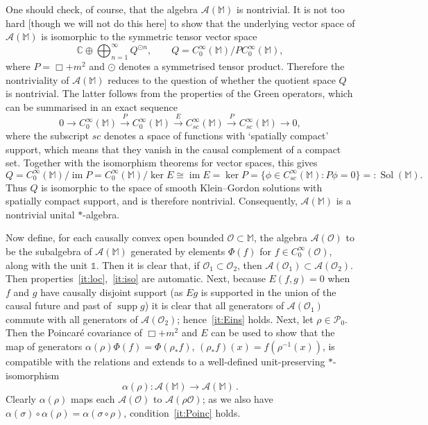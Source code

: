 \documentclass[12pt,a4paper]{article}
\newcommand{\1}{\mathds{1}}                         %
\newcommand{\CC}{\mathbb{C}}           %
\newcommand{\Ocal}{\mathcal{O}}
\newcommand{\MM}{\mathbb{M}}
\newcommand{\II}{{\mathbb{1}}}
\newcommand{\Ac}{{\mathcal{A}}}
\newcommand{\Pc}{{\mathcal{P}}}
\newcommand{\CoinX}[1]{C_0^\infty(#1)}
\DeclareMathOperator{\im}{im}
\DeclareMathOperator{\supp}{supp}
\DeclareMathOperator{\Sol}{Sol}
\begin{document}
	One should check, of course, that the algebra $\Ac(\MM)$ is nontrivial. It is not too hard [though we will not do this here] to show that the underlying vector space of $\Ac(\MM)$ is isomorphic to the symmetric tensor vector space
	\[
	\CC \oplus \bigoplus_{n=1}^\infty Q^{\odot n}, \qquad Q = \CoinX{\MM}/P \CoinX{\MM},
	\]
	where $P=\Box+m^2$ and $\odot$ denotes a symmetrised tensor product.  
	Therefore the nontriviality of $\Ac(\MM)$ reduces to the question of whether the quotient space $Q$ is nontrivial. 
	The latter follows from the properties of the Green operators, which can be summarised in an exact sequence~\cite{BarGinouxPfaffle}
	\begin{equation}\label{eq:exactsequence}
	0 \longrightarrow \CoinX{\MM}\stackrel{P}{\longrightarrow}  \CoinX{\MM} \stackrel{E}{\longrightarrow}
	C^\infty_{\textit{sc}} (\MM) \stackrel{P}{\longrightarrow}C^\infty_{\textit{sc}} (\MM) \longrightarrow 0,
	\end{equation} 
	where the subscript $sc$ denotes a space of functions with `spatially compact' support, which means that they vanish in the causal complement of a compact set. Together with the isomorphism theorems for vector spaces, this gives
	\begin{equation}
	Q =\CoinX{\MM}/\im P = \CoinX{\MM}/\ker E \cong \im E = \ker P =\{\phi\in C^\infty_{\textit{sc}} (\MM): P\phi=0\}=:\Sol(\MM).
	\end{equation}
	Thus $Q$ is isomorphic to the space of smooth Klein--Gordon solutions with spatially compact support, and is therefore nontrivial. Consequently, $\Ac(\MM)$ is a nontrivial unital $*$-algebra.
	
	Now define, for each causally convex open bounded $\Ocal\subset\MM$, the algebra $\Ac(\Ocal)$ to be the subalgebra of $\Ac(\MM)$ generated by elements $\Phi(f)$ for $f\in\CoinX{\Ocal}$, along with the unit $\II$. 
	Then it is clear that, if $\Ocal_1\subset \Ocal_2$, then $\Ac(\Ocal_1)\subset \Ac(\Ocal_2)$. Then properties~\ref{it:loc},~\ref{it:iso} are automatic.
	Next, because $E(f,g)=0$ when $f$ and $g$ have causally disjoint support (as $Eg$ is supported in the union of the causal future and past of $\supp g$) it is clear that all generators of $\Ac(\Ocal_1)$ commute with all generators of $\Ac(\Ocal_2)$; hence~\ref{it:Eins} holds. Next, let $\rho\in\Pc_0$. Then the Poincar\'e covariance of $\Box+m^2$ and $E$ can be used to show that
	the map of generators $\alpha(\rho)\Phi(f) = \Phi(\rho_* f)$, $(\rho_*f)(x)=f(\rho^{-1}(x))$, is compatible with the relations and extends to a well-defined unit-preserving $*$-isomorphism
	\begin{equation}
	\alpha(\rho):\Ac(\MM)\to\Ac(\MM)\,.
	\end{equation}
	Clearly $\alpha(\rho)$ maps each $\Ac(\Ocal)$ to $\Ac(\rho\Ocal)$; as we also have $\alpha(\sigma)\circ\alpha(\rho)=\alpha(\sigma\circ\rho)$,  condition~\ref{it:Poinc} holds. 
	
\end{document}
